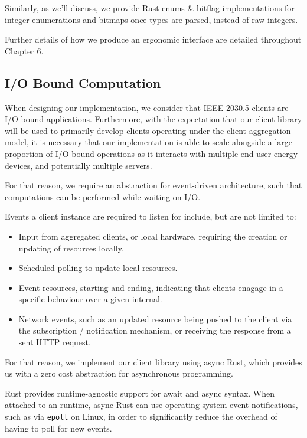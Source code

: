 Similarly, as we'll discuss, we provide Rust enums \& bitflag implementations for integer enumerations and bitmaps once types are parsed, instead of raw integers.

Further details of how we produce an ergonomic interface are detailed throughout Chapter 6.

\subsection{I/O Bound Computation}
When designing our implementation, we consider that IEEE 2030.5 clients are I/O bound applications. Furthermore, with the expectation that our client library will be used to primarily develop clients operating under the client aggregation model, it is necessary that our implementation is able to scale alongside a large proportion of I/O bound operations as it interacts with multiple end-user energy devices, and potentially multiple servers.

For that reason, we require an abstraction for event-driven architecture, such that computations can be performed while waiting on I/O.

Events a client instance are required to listen for include, but are not limited to:

\begin{itemize}
    \item Input from aggregated clients, or local hardware, requiring the creation or updating of resources locally.
    \item Scheduled polling to update local resources.
    \item Event resources, starting and ending, indicating that clients enagage in a specific behaviour over a given internal.
    \item Network events, such as an updated resource being pushed to the client via the subscription / notification mechanism, or receiving the response from a sent HTTP request.
\end{itemize}

For that reason, we implement our client library using async Rust, which provides us with a zero cost abstraction for asynchronous programming.

Rust provides runtime-agnostic support for await and async syntax.
When attached to an runtime, async Rust can use operating system event notifications, such as via \texttt{epoll} on Linux, in order to significantly reduce the overhead of having to poll for new events.

